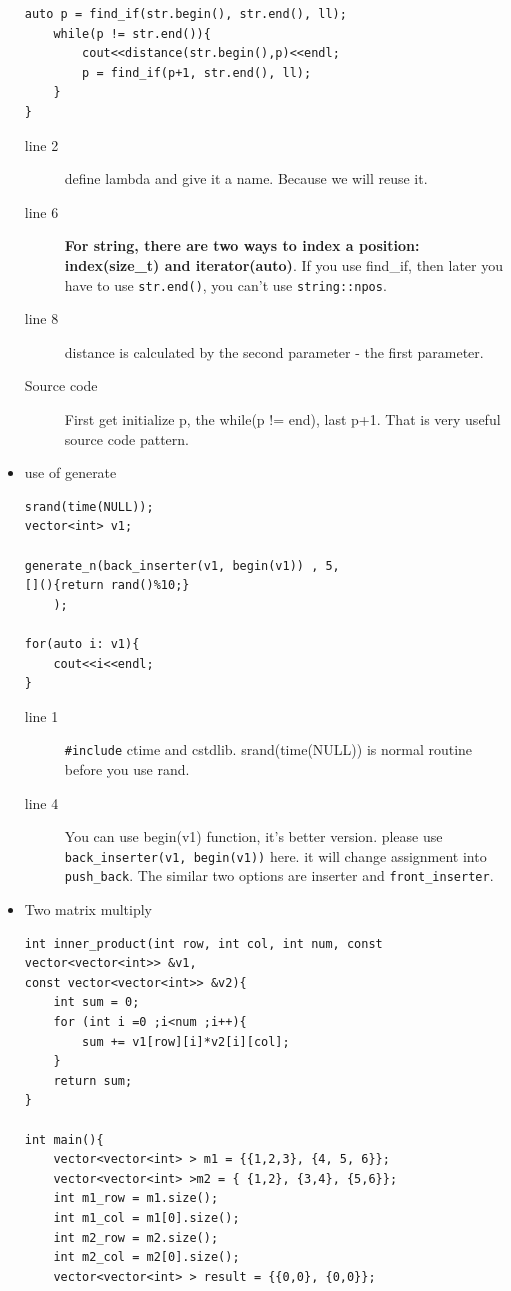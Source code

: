 \documentclass[a4paper,11pt,twoside]{book}
\begin{document}
\begin{itemize}
\begin{lstlisting}[numbers=none]
	auto p = find_if(str.begin(), str.end(), ll);
	while(p != str.end()){
		cout<<distance(str.begin(),p)<<endl;
		p = find_if(p+1, str.end(), ll);
	}
}	
\end{lstlisting}
\begin{description}
	\item[line 2] define lambda and give it a name. Because we will reuse it.
	\item[line 6] \textbf{For string, there are two ways to index a position: index(size\_t) and iterator(auto)}. If you use find\_if, then later you have to use \texttt{str.end()}, you can't use \texttt{string::npos}.
	\item[line 8] distance is calculated by the second parameter - the first parameter.
	\item[Source code] First get initialize p, the while(p != end), last p+1. That is very useful source code pattern. 
\end{description}


\item use of generate
\begin{lstlisting}[numbers=none]
srand(time(NULL));
vector<int> v1;

generate_n(back_inserter(v1, begin(v1)) , 5,
[](){return rand()%10;} 
	);	
		
for(auto i: v1){
	cout<<i<<endl;
}		
\end{lstlisting}
	\begin{description}
		\item[line 1] \texttt{\#include} ctime and cstdlib. srand(time(NULL)) is normal routine before you use rand.
		\item[line 4] You can use begin(v1) function, it's better version. please use \texttt{back\_inserter(v1, begin(v1))} here. it will change assignment into \texttt{push\_back}. The similar two options are inserter and \texttt{front\_inserter}. 
		
	\end{description}
	
	
	
\item Two matrix multiply
\begin{lstlisting}[]
int inner_product(int row, int col, int num, const vector<vector<int>> &v1, 
const vector<vector<int>> &v2){
	int sum = 0;
	for (int i =0 ;i<num ;i++){
		sum += v1[row][i]*v2[i][col];
	}
	return sum;
}

int main(){
	vector<vector<int> > m1 = {{1,2,3}, {4, 5, 6}};
	vector<vector<int> >m2 = { {1,2}, {3,4}, {5,6}};
	int m1_row = m1.size();
	int m1_col = m1[0].size();
	int m2_row = m2.size();
	int m2_col = m2[0].size();
	vector<vector<int> > result = {{0,0}, {0,0}};
	

\end{lstlisting}
\end{itemize}
\end{document}
